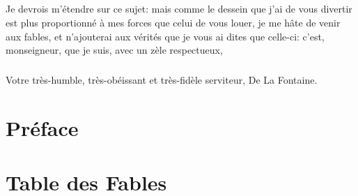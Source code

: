 \documentclass{book}
\begin{document}
\paragraph{}
Je devrois m'\'etendre sur ce sujet: mais comme le dessein que j'ai de vous divertir est plus proportionn\'e \`a mes forces que celui de vous louer, je me h\^ate de venir aux fables, et n'ajouterai aux v\'erit\'es que je vous ai dites que celle-ci: c'est, monseigneur, que je suis, avec un z\`ele respectueux,
\paragraph{}
Votre tr\`es-humble, tr\`es-ob\'eissant et tr\`es-fid\`ele serviteur,
De La Fontaine.
\chapter*{Pr\'eface}
\mainmatter
\backmatter
\chapter*{Table des Fables}
\end{document}

